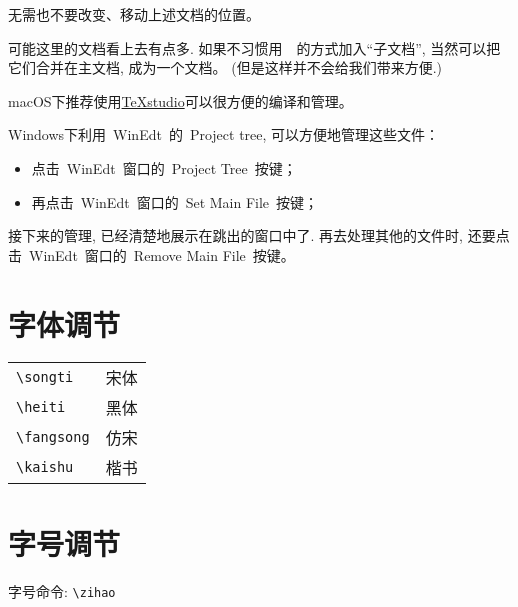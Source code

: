 \documentclass[smd,entitle,forlib,AutoFakeBold]{NJTECHMaster}
\begin{document}
无需也不要改变、移动上述文档的位置。

可能这里的文档看上去有点多. 如果不习惯用~\verb||~的方式加入``子文档'', 当然可以把它们合并在主文档, 成为一个文档。
({\kaishu 但是这样并不会给我们带来方便.})

macOS下推荐使用\href{https://www.texstudio.org/}{TeXstudio}可以很方便的编译和管理。


Windows下利用~WinEdt~的~Project tree, 可以方便地管理这些文件：
\begin{itemize}
	\item 点击~WinEdt~窗口的~Project Tree~按键；
	\item 再点击~WinEdt~窗口的~Set Main File~按键；
\end{itemize}
接下来的管理, 已经清楚地展示在跳出的窗口中了. 再去处理其他的文件时, 还要点击~WinEdt~窗口的~Remove Main File~按键。

\section{字体调节}

\begin{tabular}{ll}
	\verb|\songti| & {\songti 宋体} \\
	\verb|\heiti| & {\heiti 黑体} \\
	\verb|\fangsong| & {\fangsong 仿宋} \\
	\verb|\kaishu| & {\kaishu 楷书} \\
\end{tabular}

\section{字号调节}
字号命令: \verb|\zihao|
\end{document}
